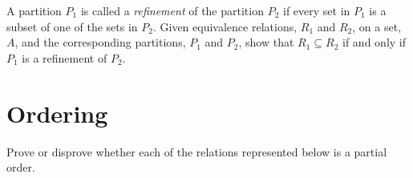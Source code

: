 \documentclass[addpoints]{exam}
\begin{document}
\begin{questions}
\begin{solution}
\begin{parts}
    \part 
    \part 
    \end{parts}
  \end{solution}

\question[5] A partition $P_1$ is called a \textit{refinement} of the partition $P_2$ if every set in $P_1$ is a subset of one of the sets in $P_2$. Given equivalence relations, $R_1$ and $R_2$, on a set, $A$, and the corresponding partitions, $P_1$ and $P_2$, show that $R_1 \subseteq R_2$ if and only if $P_1$ is a refinement of $P_2$.
  \begin{solution}
  \end{solution}

  \section{Ordering}
  
\question Prove or disprove whether each of the relations represented below is a partial order.
  \begin{multicols}{3}
  \end{multicols}
  \begin{solution}
    \begin{parts}
    \part 

\end{parts}
\end{solution}
\end{questions}
\end{document}
